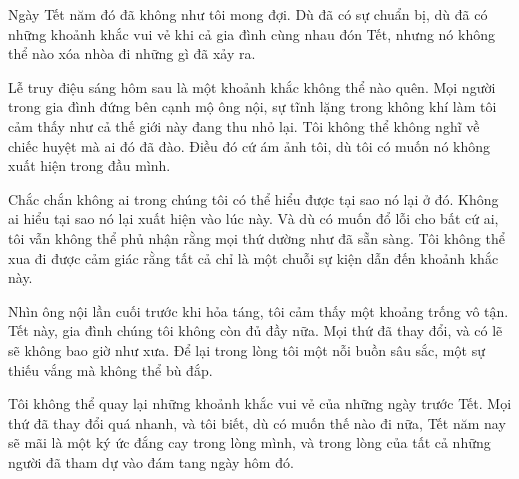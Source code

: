 \documentclass[../main.tex]{subfiles}
\begin{document}

Ngày Tết năm đó đã không như tôi mong đợi. Dù đã có sự chuẩn bị, dù đã có những khoảnh khắc vui vẻ khi cả gia đình cùng nhau đón Tết, nhưng nó không thể nào xóa nhòa đi những gì đã xảy ra.

Lễ truy điệu sáng hôm sau là một khoảnh khắc không thể nào quên. Mọi người trong gia đình đứng bên cạnh mộ ông nội, sự tĩnh lặng trong không khí làm tôi cảm thấy như cả thế giới này đang thu nhỏ lại. Tôi không thể không nghĩ về chiếc huyệt mà ai đó đã đào. Điều đó cứ ám ảnh tôi, dù tôi có muốn nó không xuất hiện trong đầu mình.

Chắc chắn không ai trong chúng tôi có thể hiểu được tại sao nó lại ở đó. Không ai hiểu tại sao nó lại xuất hiện vào lúc này. Và dù có muốn đổ lỗi cho bất cứ ai, tôi vẫn không thể phủ nhận rằng mọi thứ dường như đã sẵn sàng. Tôi không thể xua đi được cảm giác rằng tất cả chỉ là một chuỗi sự kiện dẫn đến khoảnh khắc này.

Nhìn ông nội lần cuối trước khi hỏa táng, tôi cảm thấy một khoảng trống vô tận. Tết này, gia đình chúng tôi không còn đủ đầy nữa. Mọi thứ đã thay đổi, và có lẽ sẽ không bao giờ như xưa. Để lại trong lòng tôi một nỗi buồn sâu sắc, một sự thiếu vắng mà không thể bù đắp.

Tôi không thể quay lại những khoảnh khắc vui vẻ của những ngày trước Tết. Mọi thứ đã thay đổi quá nhanh, và tôi biết, dù có muốn thế nào đi nữa, Tết năm nay sẽ mãi là một ký ức đắng cay trong lòng mình, và trong lòng của tất cả những người đã tham dự vào đám tang ngày hôm đó.
\end{document}
